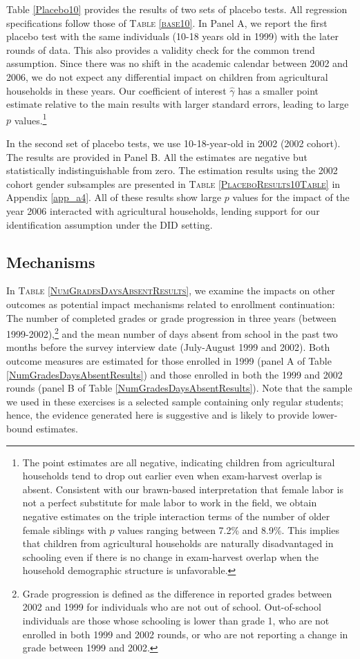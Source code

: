\documentclass[12pt,letterpaper]{article}
\newcommand{\0}{\ensuremath{\mbox{\boldmath $0$}}}
\begin{document}
Table \ref{Placebo10} provides the results of two sets of placebo tests. All regression specifications follow those of \textsc{Table \ref{base10}}. In Panel A, we report the first placebo test with the same individuals (10-18 years old in 1999) with the later rounds of data. This also provides a validity check for the common trend assumption. Since there was no shift in the academic calendar between 2002 and 2006, we do not expect any differential impact on children from agricultural households in these years. Our coefficient of interest $\hat{\gamma}$ has a smaller point estimate relative to the main results with larger standard errors, leading to large $p$ values.\footnote{The point estimates are all negative, indicating children from agricultural households tend to drop out earlier even when exam-harvest overlap is absent. Consistent with our brawn-based interpretation that female labor is not a perfect substitute for male labor to work in the field, we obtain negative estimates on the triple interaction terms of the number of older female siblings with $p$ values ranging between 7.2\% and 8.9\%. This implies that children from agricultural households are naturally disadvantaged in schooling even if there is no change in exam-harvest overlap when the household demographic structure is unfavorable.}

In the second set of placebo tests, we use 10-18-year-old in 2002 (2002 cohort). The results are provided in Panel B. All the estimates are negative but statistically indistinguishable from zero. The estimation results using the 2002 cohort gender subsamples are presented in \textsc{Table \ref{PlaceboResults10Table}} in Appendix \ref{app_a4}. All of these results show large $p$ values for the impact of the year 2006 interacted with agricultural households, lending support for our identification assumption under the DID setting.

\subsection{Mechanisms}

In \textsc{\small Table \ref{NumGradesDaysAbsentResults}}, we examine the impacts on other outcomes as potential impact mechanisms related to enrollment continuation: The number of completed grades or grade progression in three years (between 1999-2002),\footnote{Grade progression is defined as the difference in reported grades between 2002 and 1999 for individuals who are not out of school. Out-of-school individuals are those whose schooling is lower than grade 1, who are not enrolled in both 1999 and 2002 rounds, or who are not reporting a change in grade between 1999 and 2002.} and the mean number of days absent from school in the past two months before the survey interview date (July-August 1999 and 2002). Both outcome measures are estimated for those enrolled in 1999 (panel A of Table \ref{NumGradesDaysAbsentResults}) and those enrolled in both the 1999 and 2002 rounds (panel B of Table \ref{NumGradesDaysAbsentResults}). Note that the sample we used in these exercises is a selected sample containing only regular students; hence, the evidence generated here is suggestive and is likely to provide lower-bound estimates.  
\end{document}
